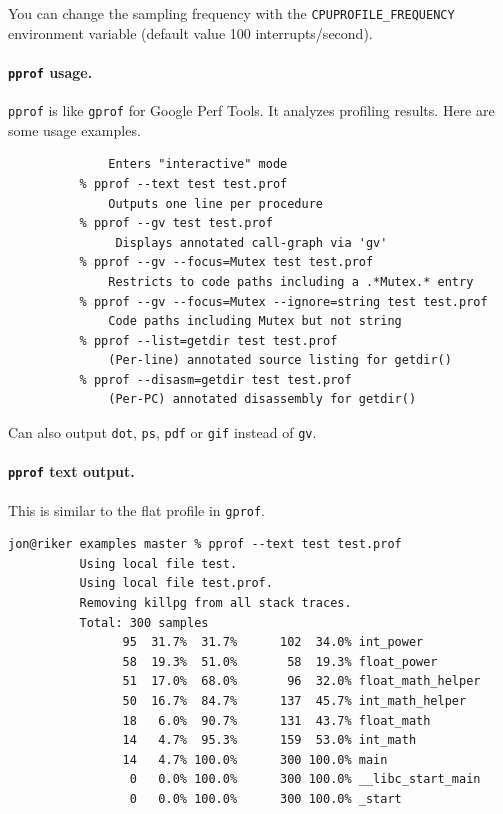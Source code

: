 \documentclass[a4paper]{report}
\begin{document}
You can change the sampling frequency with the {\tt CPUPROFILE\_FREQUENCY} environment variable
(default value 100 interrupts/second).

\paragraph{{\tt pprof} usage.} {\tt pprof} is like {\tt gprof} for Google Perf Tools. It
analyzes profiling results. Here are some usage examples.
  \begin{lstlisting}[basicstyle=\scriptsize]
          % pprof test test.prof
              Enters "interactive" mode
          % pprof --text test test.prof
              Outputs one line per procedure
          % pprof --gv test test.prof
               Displays annotated call-graph via 'gv'
          % pprof --gv --focus=Mutex test test.prof
              Restricts to code paths including a .*Mutex.* entry
          % pprof --gv --focus=Mutex --ignore=string test test.prof
              Code paths including Mutex but not string
          % pprof --list=getdir test test.prof
              (Per-line) annotated source listing for getdir()
          % pprof --disasm=getdir test test.prof
              (Per-PC) annotated disassembly for getdir()
  \end{lstlisting}

Can also output {\tt dot}, {\tt ps}, {\tt pdf} or {\tt gif} instead of {\tt gv}.

\paragraph{{\tt pprof} text output.}
This is similar to the flat profile in {\tt gprof}.

  \begin{lstlisting}[basicstyle=\scriptsize]
          jon@riker examples master % pprof --text test test.prof 
          Using local file test.
          Using local file test.prof.
          Removing killpg from all stack traces.
          Total: 300 samples
                95  31.7%  31.7%      102  34.0% int_power
                58  19.3%  51.0%       58  19.3% float_power
                51  17.0%  68.0%       96  32.0% float_math_helper
                50  16.7%  84.7%      137  45.7% int_math_helper
                18   6.0%  90.7%      131  43.7% float_math
                14   4.7%  95.3%      159  53.0% int_math
                14   4.7% 100.0%      300 100.0% main
                 0   0.0% 100.0%      300 100.0% __libc_start_main
                 0   0.0% 100.0%      300 100.0% _start
  \end{lstlisting}
\end{document}
